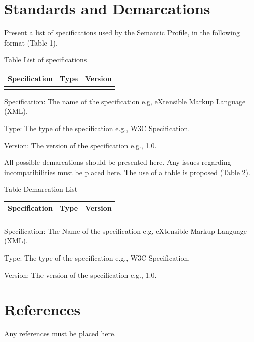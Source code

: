 \documentclass{article}
\newcounter{Table}
\renewcommand\theTable{\arabic{Table}}
\begin{document}
\section[Standards and Demarcations]{Standards and Demarcations}
Present a list of specifications used by the Semantic Profile, in the following format (Table 1).

Table \stepcounter{Table}{\theTable} List of specifications

\begin{flushleft}
\tablefirsthead{}
\tablehead{}
\tabletail{}
\tablelasttail{}
\begin{supertabular}{|m{3.1538599in}|m{1.8323599in}|m{0.8677598in}|}
\hline
{ Specification} &
{ Type} &
{ Version}\\\hline
 &
 &
\\\hline
\end{supertabular}
\end{flushleft}
Specification: The name of the specification e.g, eXtensible Markup Language (XML).

Type: The type of the specification e.g., W3C Specification.

Version: The version of the specification e.g., 1.0.

All possible demarcations should be presented here. Any issues regarding incompatibilities must be placed here. The use of a table is proposed (Table 2).

Table \stepcounter{Table}{\theTable} Demarcation List

\begin{flushleft}
\tablefirsthead{}
\tablehead{}
\tabletail{}
\tablelasttail{}
\begin{supertabular}{|m{3.1538599in}|m{1.8323599in}|m{0.8677598in}|}
\hline
{ Specification} &
{ Type} &
{ Version}\\\hline
 &
 &
\\\hline
\end{supertabular}
\end{flushleft}
Specification: The Name of the specification e.g, eXtensible Markup Language (XML).

Type: The type of the specification e.g., W3C Specification.

Version: The version of the specification e.g., 1.0.

\section[References]{References}
Any references must be placed here.
\end{document}
